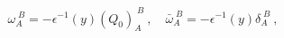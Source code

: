 \begin{equation} 
	\omega_A^{\;B}=-\epsilon^{-1}(y)(Q_{0})_A^{\;B}\ ,\quad\bar{\omega}_A^{\;B}=-\epsilon^{-1}(y)\delta_A^{\;B}\ ,
	\end{equation} 
